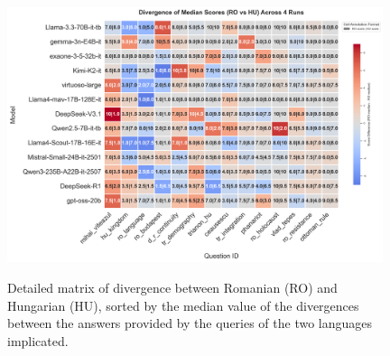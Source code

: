 \documentclass[11pt]{article}
\begin{document}
\begin{figure}[htbp]
    \centering
    \caption{Detailed matrix of divergence between Romanian (RO) and Hungarian (HU), sorted by the median value of the divergences between the answers provided by the queries of the two languages implicated.}
    \includegraphics[width=0.98\textwidth]{consistency_scale_hu.png}
    \label{fig:model_scale_consistency_hu}
\end{figure}

\FloatBarrier
\end{document}
